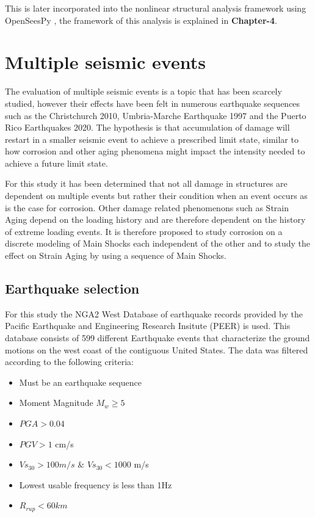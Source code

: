 This is later incorporated into the nonlinear structural analysis framework using OpenSeesPy \cite{McKenna2010}\cite{Zhu2018}, the framework of this analysis is explained in \textbf{Chapter-4}.


\section{Multiple seismic events}

The evaluation of multiple seismic events is a topic that has been scarcely studied, however their effects have been felt in numerous earthquake sequences such as the Christchurch 2010, Umbria-Marche Earthquake 1997 and the Puerto Rico Earthquakes 2020. The hypothesis is that accumulation of damage will restart in a smaller seismic event to achieve a prescribed limit state, similar to how corrosion and other aging phenomena might impact the intensity needed to achieve a future limit state. 

For this study it has been determined that not all damage in structures are dependent on multiple events but rather their condition when an event occurs as is the case for corrosion. Other damage related phenomenons such as Strain Aging depend on the loading history and are therefore dependent on the history of extreme loading events. It is therefore proposed to study corrosion on a discrete modeling of Main Shocks each independent of the other and to study the effect on Strain Aging by using a sequence of Main Shocks.

\subsection{Earthquake selection}

For this study the NGA2 West Database of earthquake records provided by the Pacific Earthquake and Engineering Research Insitute (PEER) \cite{Ancheta2014} is used. This database consists of 599 different Earthquake events that characterize the ground motions on the west coast of the contiguous United States. The data was filtered according to the following criteria:

\begin{itemize}
	\item Must be an earthquake sequence
	\item Moment Magnitude $M_w \geqslant 5$
	\item $PGA>0.04$
	\item $PGV>1$ cm/s
	\item $Vs_{30}>100m/s$ \& $Vs_{30}<1000$ m/s
	\item Lowest usable frequency is less than 1Hz
	\item $R_{rup}<60km$
\end{itemize}

